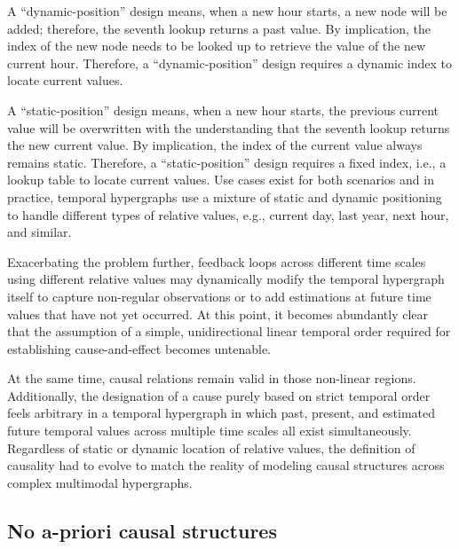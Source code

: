 A “dynamic-position” design means, when a new hour starts, a new node will be added; therefore, the seventh lookup returns a past value. By implication, the index of the new node needs to be looked up to retrieve the value of the new current hour. Therefore, a “dynamic-position” design requires a dynamic index to locate current values.

A “static-position” design means, when a new hour starts, the previous current value will be overwritten with the understanding that the seventh lookup returns the new current value. By implication, the index of the current value always remains static. Therefore, a “static-position” design requires a fixed index, i.e., a lookup table to locate current values. Use cases exist for both scenarios and in practice, temporal hypergraphs use a mixture of static and dynamic positioning to handle different types of relative values, e.g., current day, last year, next hour, and similar.

Exacerbating the problem further, feedback loops across different time scales using different relative values may dynamically modify the temporal hypergraph itself to capture non-regular observations or to add estimations at future time values that have not yet occurred.   
At this point, it becomes abundantly clear that the assumption of a simple, unidirectional linear temporal order required for establishing cause-and-effect becomes untenable.

At the same time, causal relations remain valid in those non-linear regions. Additionally, the designation of a cause purely based on strict temporal order feels arbitrary in a temporal hypergraph in which past, present, and estimated future temporal values across multiple time scales all exist simultaneously. Regardless of static or dynamic location of relative values, the definition of causality had to evolve to match the reality of modeling causal structures across complex multimodal hypergraphs.


\subsection{No a-priori causal structures}

